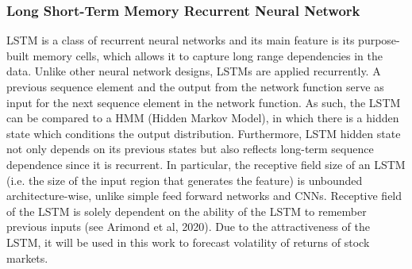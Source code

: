 \documentclass[a4paper,11pt,oneside]{book}
\begin{document}
\subsubsection{Long Short-Term Memory Recurrent Neural Network}
LSTM is a class of recurrent neural networks and its main feature is its purpose-built memory cells, which allows it to capture long range dependencies in the data. Unlike other neural network designs, LSTMs are applied recurrently.\newline\newline
A previous sequence element and the output from the network function serve as input for the next sequence element in the network function. As such, the LSTM can be compared to a HMM (Hidden Markov Model), in which there is a hidden state which conditions the output distribution. Furthermore, LSTM hidden state not only depends on its previous states but also reflects long-term sequence dependence since it is recurrent. In particular, the receptive field size of an LSTM (i.e. the size of the input region that generates the feature) is unbounded architecture-wise, unlike simple feed forward networks and CNNs. Receptive field of the LSTM is solely dependent on the ability of the LSTM to remember previous inputs (see Arimond et al, 2020). \newline\newline Due to the attractiveness of the LSTM, it will be used in this work to forecast volatility of returns of stock markets. \newline\newline
\end{document}
